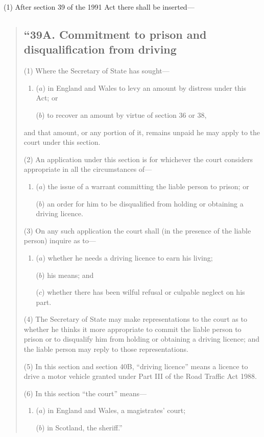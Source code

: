 \documentclass[12pt,a4paper]{article}
\begin{document}
(1) After section 39 of the 1991 Act there shall be inserted—
\begin{quotation}
\subsection*{“39A. Commitment to prison and disqualification from driving}

(1) Where the Secretary of State has sought—
\begin{enumerate}\item[]
($a$) in England and Wales to levy an amount by distress under this Act; or

($b$) to recover an amount by virtue of section 36 or 38,
\end{enumerate}
and that amount, or any portion of it, remains unpaid he may apply to the court under this section.

(2) An application under this section is for whichever the court considers appropriate in all the circumstances of—
\begin{enumerate}\item[]
($a$) the issue of a warrant committing the liable person to prison; or

($b$) an order for him to be disqualified from holding or obtaining a driving licence.
\end{enumerate}

(3) On any such application the court shall (in the presence of the liable person) inquire as to—
\begin{enumerate}\item[]
($a$) whether he needs a driving licence to earn his living;

($b$) his means; and

($c$) whether there has been wilful refusal or culpable neglect on his part.
\end{enumerate}

(4) The Secretary of State may make representations to the court as to whether he thinks it more appropriate to commit the liable person to prison or to disqualify him from holding or obtaining a driving licence; and the liable person may reply to those representations.

(5) In this section and section 40B, “driving licence” means a licence to drive a motor vehicle granted under Part III of the Road Traffic Act 1988. 

(6) In this section “the court” means—
\begin{enumerate}\item[]
($a$) in England and Wales, a magistrates' court;

($b$) in Scotland, the sheriff.”
\end{enumerate}
\end{quotation}
\end{document}

